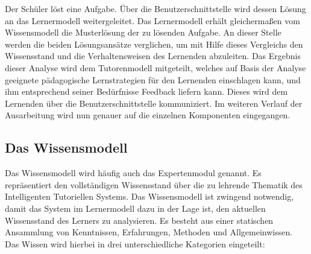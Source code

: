 Der Schüler löst eine Aufgabe. Über die Benutzerschnittstelle wird dessen Lösung
an das Lernermodell weitergeleitet. Das Lernermodell erhält gleichermaßen vom Wissensmodell
die Musterlösung der zu lösenden Aufgabe. An dieser Stelle werden die beiden Lösungsansätze
verglichen, um mit Hilfe dieses Vergleichs den Wissensstand und die Verhaltensweisen
des Lernenden abzuleiten. Das Ergebnis dieser Analyse wird dem Tutorenmodell mitgeteilt, welches
auf Basis der Analyse geeignete pädagogische Lernstrategien für den Lernenden einschlagen kann,
und ihm entsprechend seiner Bedürfnisse Feedback liefern kann. Dieses wird dem Lernenden
über die Benutzerschnittstelle kommuniziert. Im weiteren Verlauf der Ausarbeitung
wird nun genauer auf die einzelnen Komponenten eingegangen.

\subsection{Das Wissensmodell}
Das Wissensmodell wird häufig auch das Expertenmodul genannt. Es repräsentiert den vollständigen
Wissensstand über die zu lehrende Thematik des Intelligenten Tutoriellen Systems.
Das Wissensmodell ist zwingend notwendig, damit das System im Lernermodell dazu in der Lage ist,
den aktuellen Wissensstand des Lerners zu analysieren.
Es besteht aus einer statischen Ansammlung von Kenntnissen, Erfahrungen, Methoden und Allgemeinwissen.
Das Wissen wird hierbei in drei unterschiedliche Kategorien eingeteilt:

